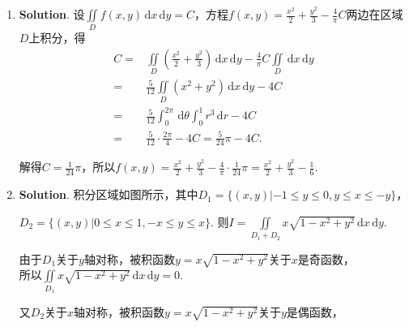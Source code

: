 \documentclass[../main.tex]{subfiles}
\begin{document}
\begin{enumerate}
    \item \textbf{Solution}. 设$\iint\limits_{D}f(x,y)\,\mathrm{d}x\,\mathrm{d}y=C$，方程$f
              (x,y)=\frac{x^{2}}{2}+\frac{y^{2}}{3}-\frac{4}{\pi}C$两边在区域$D$上积分，得
          \[
              \begin{aligned}
                  C = {} & \iint\limits_{D}\left(\frac{x^2}{2}+\frac{y^2}{3}\right)\,\mathrm{d}x\,\mathrm{d}y-\frac{4}{\pi}C\iint\limits_{D}\,\mathrm{d}x\,\mathrm{d}y \\
                  = {}   & \frac{5}{12}\iint\limits_{D}\left(x^{2}+y^{2}\right)\,\mathrm{d}x\,\mathrm{d}y-4C                                                           \\
                  = {}   & \frac{5}{12}\int_{0}^{2\pi}\,\mathrm{d}\theta\int_{0}^{1}r^{3}\,\mathrm{d}r-4C                                                              \\
                  = {}   & \frac{5}{12}\cdot \frac{2\pi}{4}-4C = \frac{5}{24}\pi - 4C.
              \end{aligned}
          \]

          解得$C=\frac{1}{24}\pi$，所以$f(x,y)=\frac{x^{2}}{2}+\frac{y^{2}}{3}-\frac{4}{\pi}
              \cdot \frac{1}{24}\pi = \frac{x^{2}}{2}+\frac{y^{2}}{3}-\frac{1}{6}$.

    \item \textbf{Solution}. 积分区域如图所示，其中$D_{1}=\{(x,y)|-1\leq y\leq 0,
              y\leq x\leq -y\}$，

          $D_{2}=\{(x,y)|0 \leq x\leq 1, -x\leq y\leq x\}$. 则$I = \iint\limits_{D_1+D_2}
              x\sqrt{1-x^{2}+y^{2}}\,\mathrm{d}x\,\mathrm{d}y$.\\
          \noindent
          \begin{minipage}[c]{0.65\textwidth}
              由于$D_{1}$关于$y$轴对称，被积函数$y=x\sqrt{1-x^{2}+y^{2}}$关于$x$是奇函数，\\[1em]
              所以$\iint\limits_{D_1}x\sqrt{1-x^{2}+y^{2}}\,\mathrm{d}x\,\mathrm{d}y=0$.

              又$D_{2}$关于$x$轴对称，被积函数$y=x\sqrt{1-x^{2}+y^{2}}$关于$y$是偶函数，


\end{minipage}
\end{enumerate}
\end{document}
